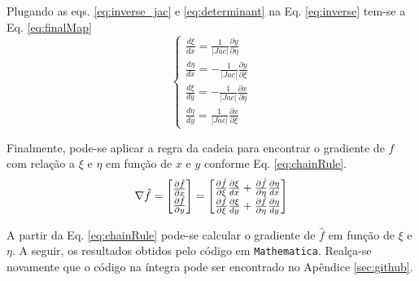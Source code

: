 Plugando as eqs. \eqref{eq:inverse_jac} e \eqref{eq:determinant} na Eq. \eqref{eq:inverse} tem-se a Eq. \eqref{eq:finalMap}
\begin{equation}
    \label{eq:finalMap}
    \begin{cases}
        \frac{d\xi}{dx} =  \frac{1}{|Jac|}\frac{\partial y}{\partial \eta}\\
        \frac{d\eta}{dx} = -\frac{1}{|Jac|}\frac{\partial y}{\partial \xi}\\
        \frac{d\xi}{dy} = -\frac{1}{|Jac|}\frac{\partial x}{\partial \eta}\\
        \frac{d\eta}{dy} =  \frac{1}{|Jac|}\frac{\partial x}{\partial \xi}
    \end{cases}
\end{equation}

Finalmente, pode-se aplicar a regra da cadeia para encontrar o gradiente de $f$ com rela\c{c}\~ao a $\xi$ e $\eta$ em fun\c{c}\~ao de $x$ e $y$ conforme Eq. \eqref{eq:chainRule}.
\begin{equation}
    \label{eq:chainRule}
    \nabla \hat f = 
    \begin{bmatrix}
        \frac{\partial \hat f}{\partial x} \\
        \frac{\partial \hat f}{\partial y}
    \end{bmatrix} = 
    \begin{bmatrix}
        \frac{\partial \hat f}{\partial \xi} \frac{\partial \xi }{dx} + \frac{\partial \hat f}{\partial \eta}\frac{\partial \eta}{dx}\\
        \frac{\partial \hat f}{\partial \xi} \frac{\partial \xi }{dy} + \frac{\partial \hat f}{\partial \eta}\frac{\partial \eta}{dy}
    \end{bmatrix}
\end{equation}

A partir da Eq. \eqref{eq:chainRule} pode-se calcular o gradiente de $\hat f$ em fun\c{c}\~ao de $\xi$ e $\eta$. A seguir, os resultados obtidos pelo c\'odigo em \texttt{Mathematica}. Real\c{c}a-se novamente que o c\'odigo na \'integra pode ser encontrado no Ap\^endice \ref{sec:github}.

